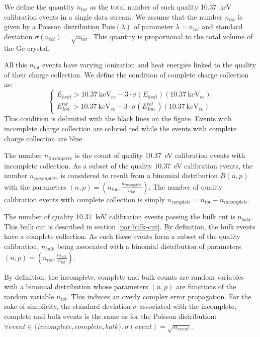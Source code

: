 We define the quantity $n_{tot}$ as the total number of such quality \SI{10.37}{\kilo\eV} calibration events in a single data stream. We assume that the number $n_{tot}$ is given by a Poisson distribution $\mathrm{Pois}(\lambda)$ of parameter $\lambda = n_{tot}$ and standard deviation $\sigma(n_{tot}) = \sqrt{n_{tot}}$. This quantity is proportional to the total volume of the Ge crystal.

All this $n_{tot}$ events have varying ionization and heat energies linked to the quality of their charge collection. We define the condition of complete charge collection as:
\begin{equation}
\begin{cases}
E_{heat} > \SI{10.37}{\kilo\eV_{ee}} - 3 \cdot \sigma(E_{heat})(\SI{10.37}{\kilo\eV_{ee}}) \\
E_{Ion.}^{tot} > \SI{10.37}{\kilo\eV_{ee}} - 3 \cdot \sigma(E_{Ion.}^{tot})(\SI{10.37}{\kilo\eV_{ee}})
\end{cases}
\end{equation}
This condition is delimited with the black lines on the figure. Events with incomplete charge collection are colored red while the events with complete charge collection are blue.

The number $n_{incomplete}$ is the count of quality \SI{10.37}{\eV} calibration events with incomplete collection. As a subset of the quality \SI{10.37}{\eV} calibration events, the number $n_{incomplete}$ is considered to result from a binomial distribution $B(n, p)$ with the parameters $(n,p) = (n_{tot}, \frac{n_{incomplete}}{n_{tot}})$. The number of quality calibration events with complete collection is simply $n_{complete} = n_{tot} - n_{incomplete}$.

The number of quality \SI{10.37}{\kilo\eV} calibration events passing the bulk cut is $n_{bulk}$. This bulk cut is described in section \ref{par:bulk-cut}. By definition, the bulk events have a complete collection. As such these events form a subset of the quality calibration, $n_{bulk}$ being associated with a binomial distribution of parameters $(n,p) = (n_{tot}, \frac{n_{bulk}}{n_{tot}})$.

By definition, the incomplete, complete and bulk counts are random variables with a binomial distribution whose parameters $(n,p)$ are functions of the random variable $n_{tot}$. This induces an overly complex error propagation. For the sake of simplicity, the standard deviation $\sigma$ associated with the incomplete, complete and bulk events is the same as for the Poisson distribution: $\forall event \in \{ incomplete, complete, bulk \}, \sigma (event) = \sqrt{n_{event}}$.

